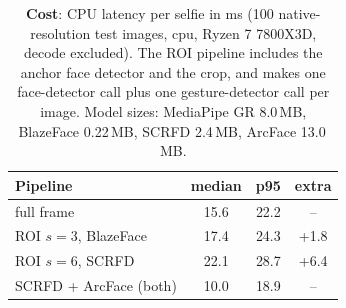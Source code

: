 \begin{table}[t]
\centering
\footnotesize
\setlength{\tabcolsep}{4pt}
\begin{tabular}{lccc}
\toprule
Pipeline & median & p95 & extra \\
\midrule
full frame & 15.6 & 22.2 & -- \\
ROI $s{=}3$, BlazeFace & 17.4 & 24.3 & +1.8 \\
ROI $s{=}6$, SCRFD & 22.1 & 28.7 & +6.4 \\
\midrule
SCRFD + ArcFace (both) & 10.0 & 18.9 & -- \\
\bottomrule
\end{tabular}
\vspace{-1mm}
\caption{\textbf{Cost}: CPU latency per selfie in ms (100 native-resolution test images, cpu, Ryzen 7 7800X3D, decode excluded). The ROI pipeline includes the anchor face detector and the crop, and makes one face-detector call plus one gesture-detector call per image. Model sizes: MediaPipe GR 8.0\,MB, BlazeFace 0.22\,MB, SCRFD 2.4\,MB, ArcFace 13.0\,MB.}
\label{tab:cost}
\vspace{-3mm}
\end{table}